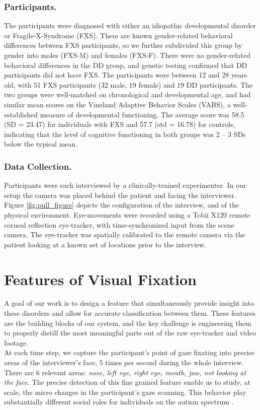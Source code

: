 \documentclass{llncs}
\begin{document}
\subsubsection{Participants.}The participants were diagnosed with either an idiopathic developmental disorder or Fragile-X-Syndrome (FXS). There are known gender-related behavioral differences between FXS participants, so we further subdivided this group by gender into males (FXS-M) and females (FXS-F). There were no gender-related behavioral differences in the DD group, and genetic testing confirmed that DD participants did not have FXS. The participants were between 12 and 28 years old, with 51 FXS participants (32 male, 19 female) and 19 DD participants. The two groups were well-matched on chronological and developmental age, and had similar mean scores on the Vineland Adaptive Behavior Scales (VABS), a well-established measure of developmental functioning. The average score was 58.5 (SD = 23.47) for individuals with FXS and 57.7 (std = 16.78) for controls, indicating that the level of cognitive functioning in both groups was 2 -- 3 SDs below the typical mean.

\vspace*{-\baselineskip}
\subsubsection{Data Collection.} Participants were each interviewed by a clinically-trained experimenter. In our setup the camera was placed behind the patient and facing the interviewer. Figure \ref{fig:pull_figure} depicts the configuration of the interview, and of the physical environment. Eye-movements were recorded using a Tobii X120 remote corneal reflection eye-tracker, with time-synchronized input from the scene camera. The eye-tracker was spatially calibrated to the remote camera via the patient looking at a known set of locations prior to the interview.
\vspace{-2 em}
\section{Features of Visual Fixation}
\vspace{-1 em}
\label{sec:feature_extraction}
A goal of our work is to design a feature that simultaneously provide insight into these disorders and allow for accurate classification between them. These features are the building blocks of our system, and the key challenge is engineering them to properly distill the most meaningful parts out of the raw eye-tracker and video footage.\\
At each time step, we capture the participant's point of gaze fixating into precise areas of the interviewer's face, 5 times per second during the whole interview. There are 6 relevant areas: \textit{nose, left eye, right eye, mouth, jaw, not looking at the face}. The precise detection of this fine grained feature enable us to study, at scale, the micro changes in the participant's gaze scanning. This behavior play substantially different social roles for individuals on the autism spectrum \cite{klin2002}.
\vspace{-2 em}
\end{document}
